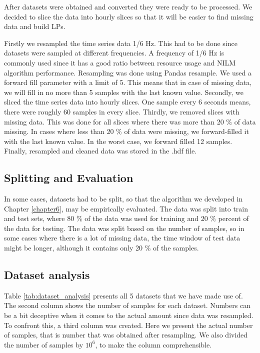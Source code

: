 After datasets were obtained and converted they were ready to be processed.
We decided to slice the data into hourly slices so that it will be easier to find missing data and build LPs.

Firstly we resampled the time series data  1/6 Hz. 
This had to be done since datasets were sampled at different frequencies.
A frequency of 1/6 Hz is commonly used since it has a good ratio between resource usage and NILM algorithm performance.
Resampling was done using Pandas resample. 
We used a forward fill parameter with a limit of 5.
This means that in case of missing data, we will fill in no more than 5 samples with the last known value.
Secondly, we sliced the time series data into hourly slices. 
One sample every 6 seconds means, there were roughly 60 samples in every slice.
Thirdly, we removed slices with missing data.
This was done for all slices where there was more than 20 \% of data missing.
In cases where less than 20 \% of data were missing, we forward-filled it with the last known value.
In the worst case, we forward filled 12 samples. 
Finally, resampled and cleaned data was stored in the .hdf file.


\subsection{Splitting and Evaluation} \label{ssec:ds_eval}

In some cases, datasets had to be split, so that the algorithm we developed in Chapter \ref{chapter6}, may be empirically evaluated. 
The data was split into train and test sets, where 80 \% of the data was used for training and 20 \% percent of the data for testing.
The data was split based on the number of samples, so in some cases where there is a lot of missing data, the time window of test data might be longer, although it contains only 20 \% of the samples.

\subsection{Dataset analysis}
Table \ref{tab:dataset_analysis} presents all 5 datasets that we have made use of.
The second column shows the number of samples for each dataset.
Numbers can be a bit deceptive when it comes to the actual amount since data was resampled.
To confront this, a third column was created.
Here we present the actual number of samples,
that is number that was obtained after resampling.
We also divided the number of samples by $10^6$, to make the column comprehensible.

